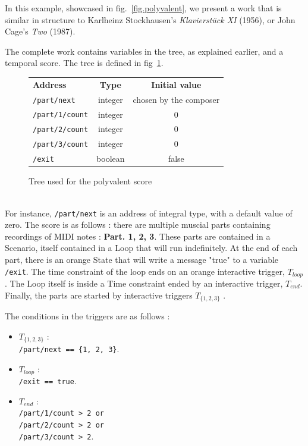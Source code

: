 \documentclass{article}
\begin{document}
In this example, showcased in fig.~\ref{fig.polyvalent}, we present a work that is similar in structure to Karlheinz Stockhausen's \emph{Klavierstück XI} (1956), or John Cage's \emph{Two} (1987). 

The complete work contains variables in the tree, as explained earlier, and a temporal score.
The tree is defined in fig~\ref{fig.tablescore}.
\begin{figure}[h]
    \begin{tabular}{lcc}        
        \textbf{Address} & \textbf{Type} & \textbf{Initial value} \\
        \lstinline|/part/next|    & integer & chosen by the composer \\
        \lstinline|/part/1/count| & integer & 0 \\
        \lstinline|/part/2/count| & integer & 0 \\
        \lstinline|/part/3/count| & integer & 0 \\
        \lstinline|/exit|         & boolean & false
    \end{tabular}
    \caption{Tree used for the polyvalent score}
    \label{fig.tablescore}
\end{figure}~\\
For instance, \lstinline{/part/next} is an address of integral type, with a default value of zero. 
The score is as follows : there are multiple muscial parts containing recordings of MIDI notes : \textbf{Part. 1, 2, 3}.
These parts are contained in a Scenario, itself contained in a Loop that will run indefinitely. 
At the end of each part, there is an orange State that will write a message "true" to a variable \lstinline{/exit}.
The time constraint of the loop ends on an orange interactive trigger, $T_{loop}$.
The Loop itself is inside a Time constraint ended by an interactive trigger, $T_{end}$.
Finally, the parts are started by interactive triggers  $T_{\{1, 2, 3\}}$ .

The conditions in the triggers are as follows : 
\begin{itemize}
\item  $T_{\{1, 2, 3\}}$ : ~\\ \lstinline|/part/next == {1, 2, 3}|.
\item $T_{loop}$ : ~\\ \lstinline{/exit == true}.
\item $T_{end}$ : ~\\
\lstinline{/part/1/count > 2 or} \\
\lstinline{/part/2/count > 2 or} \\
\lstinline{/part/3/count > 2}.
\end{itemize}
\end{document}

